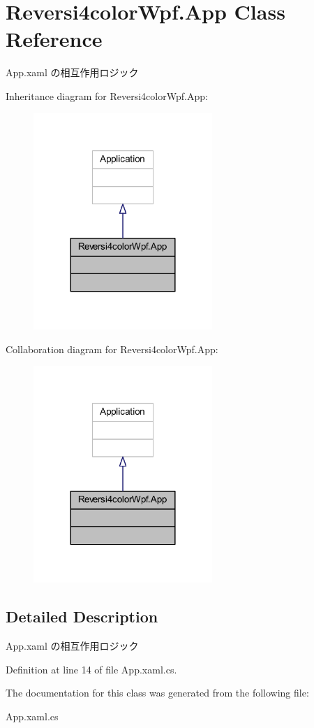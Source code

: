 \hypertarget{class_reversi4color_wpf_1_1_app}{}\section{Reversi4color\+Wpf.\+App Class Reference}
\label{class_reversi4color_wpf_1_1_app}


App.\+xaml の相互作用ロジック  




Inheritance diagram for Reversi4color\+Wpf.\+App\+:
\nopagebreak
\begin{figure}[H]
\begin{center}
\leavevmode
\includegraphics[width=192pt]{class_reversi4color_wpf_1_1_app__inherit__graph}
\end{center}
\end{figure}


Collaboration diagram for Reversi4color\+Wpf.\+App\+:
\nopagebreak
\begin{figure}[H]
\begin{center}
\leavevmode
\includegraphics[width=192pt]{class_reversi4color_wpf_1_1_app__coll__graph}
\end{center}
\end{figure}


\subsection{Detailed Description}
App.\+xaml の相互作用ロジック 



Definition at line 14 of file App.\+xaml.\+cs.



The documentation for this class was generated from the following file\+:\begin{DoxyCompactItemize}
\item 
App.\+xaml.\+cs\end{DoxyCompactItemize}
